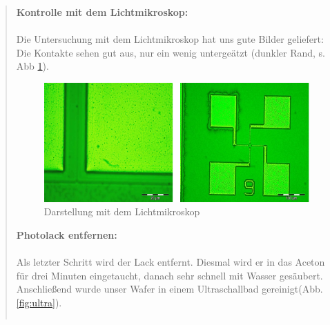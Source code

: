 \begin{quote}
    		\vspace{2em}

    		\textbf{Kontrolle mit dem Lichtmikroskop:} \\
			\\
			Die Untersuchung mit dem Lichtmikroskop hat uns gute Bilder
			geliefert: Die Kontakte sehen gut aus, nur ein wenig untergeätzt
			(dunkler Rand, s. Abb \ref{fig:darlicht}).

			\vspace{2em}

    		\begin{figure}[H]
				\hspace{0 cm}
                  \includegraphics[scale=1, trim = 0cm 0cm 0cm 0cm,clip]
                	{./HerstellungBilder/Lichtmikroskopbilder4.png}
                  \caption{Darstellung mit dem Lichtmikroskop}
                \label{fig:darlicht}
            \end{figure}

    		\vspace{2em}

			\textbf{Photolack entfernen:}\\
			\\
			Als letzter Schritt wird der Lack entfernt. Diesmal wird er in das
			Aceton für drei Minuten eingetaucht, danach sehr schnell mit Wasser
			gesäubert. Anschließend wurde unser Wafer in einem Ultraschallbad
			gereinigt(Abb.\ref{fig:ultra}).

			\vspace{2em}

    		\begin{center}
                \begin{tabular}{ll}


\end{tabular}
\end{center}
\end{quote}

